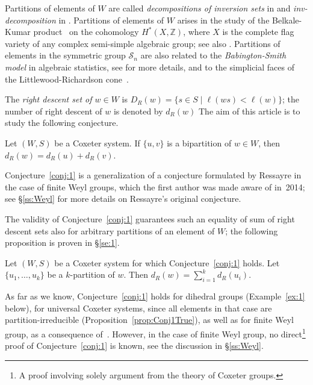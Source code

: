 \documentclass[Unicode]{cedram-alco}
\theoremstyle{definition}
\begin{document}
Partitions of elements of $W$ are called {\em decompositions of inversion sets} in \cite{DeDiRo17} and {\em inv-decomposition} in \cite{Ka13}. Partitions of elements of $W$ arises in the study of the Belkale-Kumar product~\cite{BeKu06} on the cohomology $H^*(X,\mathbb Z)$, where $X$ is  the complete flag variety of any complex semi-simple algebraic group; see also \cite{DiRo09,DiRo17}. Partitions of elements in the symmetric group $\mathcal S_n$ are also related to the {\em Babington-Smith model} in algebraic statistics, see \cite{Ka13} for more details, and to the simplicial faces of the Littlewood-Richardson cone~\cite{DeDiRo17}.




 The {\em right descent set of $w\in W$} is $D_R(w)=\{s\in S \mid \ell(ws)<\ell(w)\}$; the number of right descent of $w$ is  denoted by $d_R(w)$  The aim of this article is to study the following conjecture. 

\begin{conj}\label{conj:1}  Let  $(W,S)$ be a Coxeter system. If  $\{u,v\}$ is a bipartition of $w\in W$, then $d_R(w)=d_R(u)+d_R(v)$. 
\end{conj}

Conjecture~\ref{conj:1} is a generalization of a conjecture formulated by Ressayre in the case of finite Weyl groups, which the first author was made aware of in~2014; see \S\ref{ss:Weyl} for more details on Ressayre's original conjecture.

The validity of Conjecture~\ref{conj:1} guarantees such an equality of sum of right descent sets also for arbitrary partitions of an element of $W$; the following proposition  is proven in \S\ref{se:1}.

\begin{prop}\label{prop:Conj} Let $(W,S)$ be a Coxeter system for which Conjecture~\ref{conj:1} holds. Let $\{u_1,\dots,u_k\}$ be a $k$-partition of $w$. Then $d_R(w)=\sum_{i=1}^k d_R(u_i)$.
\end{prop}

As far as we know, Conjecture~\ref{conj:1} holds for dihedral groups (Example~\ref{ex:1} below), for universal Coxeter systems, since all elements in that case are partition-irreducible  (Proposition~\ref{prop:Conj1True}), as well as for finite Weyl group, as a consequence of~\cite{FrRe23}. However, in the case of finite Weyl group, no direct\footnote{A proof involving solely argument from the theory of Coxeter groups.} proof of Conjecture~\ref{conj:1} is known, see the discussion in \S\ref{ss:Weyl}.  
\end{document}
